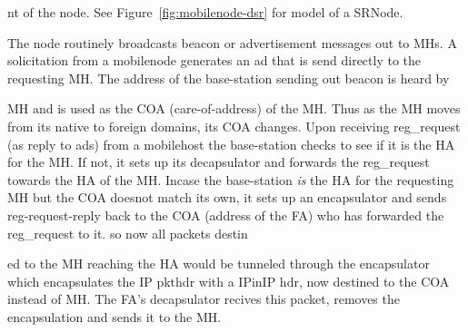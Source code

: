 {nt of the node. See Figure~\ref{fig:mobilenode-dsr} for model of a SRNode.

The  node routinely broadcasts beacon or advertisement messages out to MHs. A solicitation from a mobilenode generates an ad that is send directly to the requesting MH. The address of the base-station sending out beacon is heard by 





















MH and is used as the COA (care-of-address) of the MH. Thus as the MH moves from its native to foreign domains, its COA changes.
Upon receiving  reg\_request (as reply to ads) from a mobilehost the base-station checks to see if it is the HA for the MH. If not, it sets up its decapsulator and forwards the reg\_request towards the HA of the MH. 
Incase the base-station {\em is} the HA for the requesting MH but the COA doesnot match its own, it sets up an encapsulator and sends reg-request-reply back to the COA (address of the FA) who has forwarded the reg\_request to it. so now all packets destin





















ed to the MH reaching the HA would be tunneled through the encapsulator which encapsulates the IP pkthdr with a IPinIP hdr, now destined to the COA instead of MH. The FA's decapsulator recives this packet, removes the encapsulation and sends it to the MH.






















}
